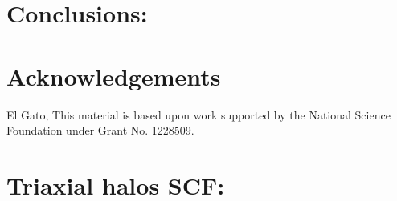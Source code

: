 \documentclass[a4paper,fleqn,usenatbib]{mnras}
\begin{document}
\section{Conclusions:}



\section*{Acknowledgements}
El Gato, 
This material is based upon work supported by the National Science
Foundation under Grant No. 1228509.










\appendix

\section{Triaxial halos SCF:}




\bsp	%
\label{lastpage}
\end{document}
